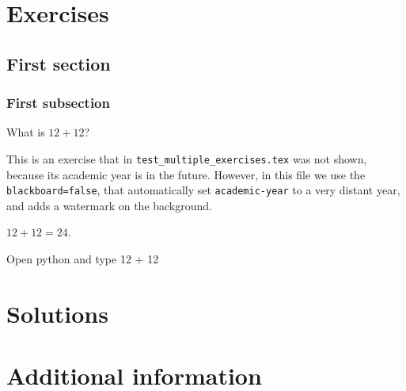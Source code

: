 \documentclass[oneside]{book}
\begin{document}
\chapter{Exercises}

\section{First section}

\subsection{First subsection}

\begin{exercise}[examdate={January 16, 2026}, examproblemnumber={1}, examproblemid={2026-01-16-01}]
  What is \(12 + 12\)?

  This is an exercise that in \texttt{test\_multiple\_exercises.tex} was not shown, because its academic year is in the future. However, in this file we use the \texttt{blackboard=false}, that automatically set \texttt{academic-year} to a very distant year, and adds a watermark on the background.
\end{exercise}

\begin{solution}
  \(12 + 12 = 24\).
\end{solution}

\begin{additionalinformation}
Open python and type 12 + 12
\end{additionalinformation}

\chapter{Solutions}

\chapter{Additional information}

\SaveReplacements
\end{document}

